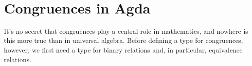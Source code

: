 \documentclass[a4paper,USenglish,cleveref,autoref,thm-restate]{lipics-v2019}
\begin{document}
\begin{code}%
\>[1]\AgdaSpace{}%
\AgdaSymbol{:}\AgdaSpace{}%
\AgdaSpace{}%
\AgdaSpace{}%
\AgdaSpace{}%
\AgdaSpace{}%
\AgdaSpace{}%
\AgdaSpace{}%
\AgdaSpace{}%
\AgdaSpace{}%
\AgdaSpace{}%
\AgdaSpace{}%
\<%
\\
%
\>[1]\AgdaSpace{}%
\AgdaSpace{}%
\AgdaSpace{}%
\AgdaSymbol{=}\AgdaSpace{}%
\AgdaSpace{}%
\AgdaSpace{}%
\AgdaSpace{}%
\AgdaSymbol{(}\AgdaSpace{}%
\AgdaSpace{}%
\AgdaSpace{}%
\AgdaSpace{}%
\AgdaSymbol{)}\AgdaSpace{}%
\AgdaFunction{,}\AgdaSpace{}%
\AgdaSpace{}%
\<%
\end{code}



\section{Congruences in Agda}\label{sec:cons-in-agda}
It's no secret that congruences play a central role in mathematics, and nowhere is this more true than in universal algebra.  Before defining a type for congruences, however, we first need a type for binary relations and, in particular, equivalence relations.
\end{document}
